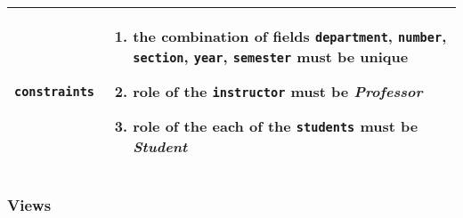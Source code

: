 \begin{table}[h]
\begin{tabular}[ht]{r|p{4in}}
        \texttt{constraints} & 
            \vspace{-7mm}
            \begin{enumerate}[leftmargin=5mm]
                \item the combination of fields \texttt{department},
                        \texttt{number},
                        \hspace{2em}\texttt{section},
                        \texttt{year},
                        \texttt{semester} must be unique
                \item role of the \texttt{instructor} must be \emph{Professor}
                \item role of the each of the \texttt{students} must be
                        \emph{Student}
            \end{enumerate} \vspace{-9mm}\\
        \hline
    \end{tabular}
    \renewcommand{\arraystretch}{1}
    
\end{table}

\subsubsection{Views}

